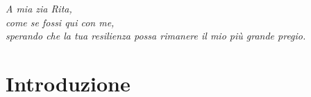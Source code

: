 \documentclass[12pt,oneside]{report}
\begin{document}
\cleardoublepage
\thispagestyle{empty}
\begin{flushright}
\itshape \textit{A mia zia Rita,\\
come se fossi qui con me,\\
sperando che la tua resilienza possa rimanere il mio più grande pregio.
}\\

\end{flushright}
\cleardoublepage













    


\tableofcontents

\newpage
\chapter*{Introduzione}
\end{document}
